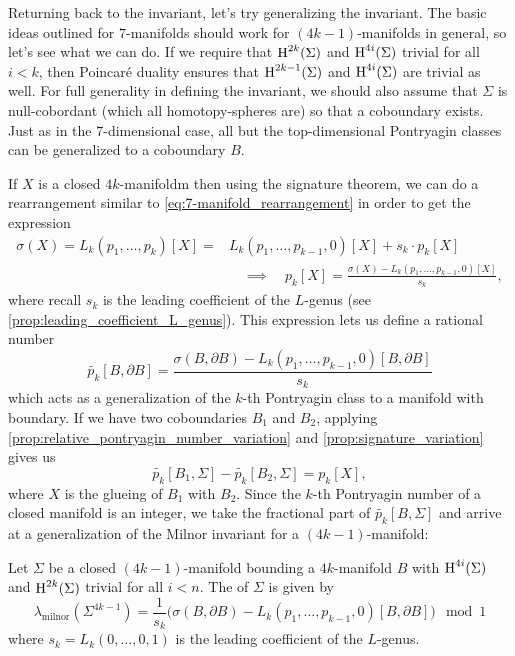 Returning back to the invariant, let's try generalizing the invariant.
The basic ideas outlined for $7$-manifolds should work for $(4k-1)$-manifolds in general, so let's see what we can do. If we require that $\operatorname{H}^{2k}(\Sigma)$ and $\operatorname{H}^{4i}(\Sigma)$ trivial for all $i<k$, then Poincar\'e duality ensures that $\operatorname{H}^{2k-1}(\Sigma)$ and $\operatorname{H}^{4i}(\Sigma)$ are trivial as well. For full generality in defining the invariant, we should also assume that $\Sigma$ is null-cobordant (which all homotopy-spheres are) so that a coboundary exists.
Just as in the $7$-dimensional case, all but the top-dimensional Pontryagin classes can be generalized to a coboundary $B$.

If $X$ is a closed $4k$-manifoldm then using the signature theorem, we can do a rearrangement similar to \cref{eq:7-manifold_rearrangement} in order to get the expression
\begin{equation}\label{eq:4k-1-manifold_rearrangement}
	\begin{aligned}
		\sigma(X) = L_k(p_1, \ldots, p_k)[X] =
		 & L_k(p_1,\ldots,p_{k-1},0)[X] + s_k \cdot p_k[X] \\
		 & \quad\implies\quad
		p_k[X] = \frac{\sigma(X) - L_k(p_1,\ldots, p_{k-1}, 0)[X]}{s_k},
	\end{aligned}
\end{equation}
where recall $s_k$ is the leading coefficient of the $L$-genus (see \cref{prop:leading_coefficient_L_genus}).
This expression lets us define a rational number
\[
	\widetilde{p_k}[B, \partial B] = \frac{\sigma(B, \partial B) - L_k(p_1,\ldots, p_{k-1}, 0)[B,\partial B]}{s_k}
\]
which acts as a generalization of the $k$-th Pontryagin class to a manifold with boundary. If we have two coboundaries $B_1$ and $B_2$, applying \cref{prop:relative_pontryagin_number_variation} and \cref{prop:signature_variation} gives us
\[
	\widetilde{p_k}[B_1, \Sigma] - \widetilde{p_k}[B_2, \Sigma] = p_k[X],
\]
where $X$ is the glueing of $B_1$ with $B_2$. Since the $k$-th Pontryagin number of a closed manifold is an integer, we take the fractional part of $\widetilde{p_k}[B,\Sigma]$ and arrive at a generalization of the Milnor invariant for a $(4k-1)$-manifold:
\begin{definition}\label{defn:milnor_invariant}
	Let $\Sigma$ be a closed $(4k-1)$-manifold bounding a $4k$-manifold $B$ with $\operatorname{H}^{4i}(\Sigma)$ and $\operatorname{H}^{2k}(\Sigma)$ trivial for all $i<n$. The  of $\Sigma$ is given by
	\[
		\boxed{
			\lambda_{\mathrm{milnor}}(\Sigma^{4k-1}) = \frac{1}{s_k}\Big(\sigma(B, \partial B) - L_k(p_1, \ldots, p_{k-1},0)[B,\partial B]\Big)\mod 1
		}
	\]
	where $s_k = L_k(0,\ldots,0,1)$ is the leading coefficient of the $L$-genus.
\end{definition}

